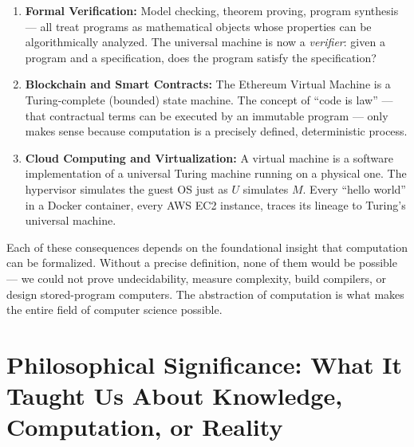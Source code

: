 \begin{enumerate}
\item \textbf{Formal Verification:} Model checking, theorem proving, program synthesis --- all treat programs as mathematical objects whose properties can be algorithmically analyzed. The universal machine is now a \emph{verifier}: given a program and a specification, does the program satisfy the specification?

\item \textbf{Blockchain and Smart Contracts:} The Ethereum Virtual Machine is a Turing-complete (bounded) state machine. The concept of ``code is law'' --- that contractual terms can be executed by an immutable program --- only makes sense because computation is a precisely defined, deterministic process.

\item \textbf{Cloud Computing and Virtualization:} A virtual machine is a software implementation of a universal Turing machine running on a physical one. The hypervisor simulates the guest OS just as $U$ simulates $M$. Every ``hello world'' in a Docker container, every AWS EC2 instance, traces its lineage to Turing's universal machine.
\end{enumerate}

Each of these consequences depends on the foundational insight that computation can be formalized. Without a precise definition, none of them would be possible --- we could not prove undecidability, measure complexity, build compilers, or design stored-program computers. The abstraction of computation is what makes the entire field of computer science possible.

\section{Philosophical Significance: What It Taught Us About Knowledge, Computation, or Reality}
\label{sec:computation:philosophy}

